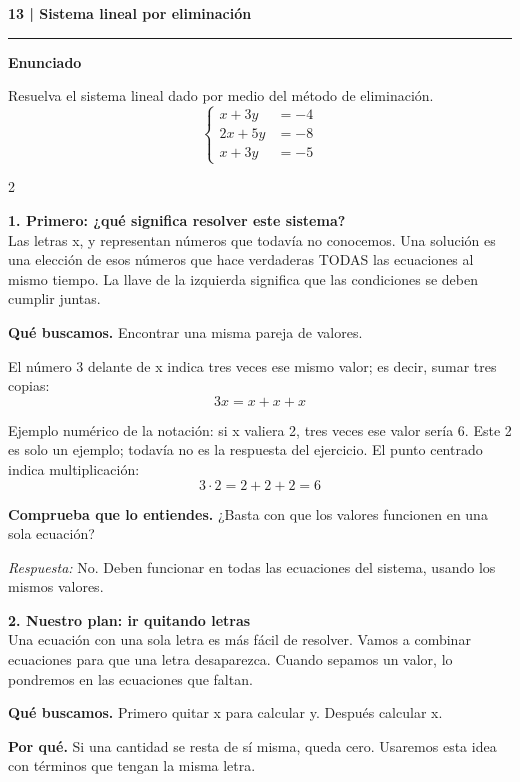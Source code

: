 \documentclass[11pt,a4paper,landscape]{article}
\newcommand{\titulo}[1]{{\LARGE\bfseries #1}\par\smallskip\hrule\medskip}
\begin{document}
\newpage{}\hypertarget{1.1-13}{}
\titulo{13 | Sistema lineal por eliminación}
\textbf{Enunciado}\par Resuelva el sistema lineal dado por medio del método de eliminación.
\[\left\{\begin{aligned}x + 3y &= -4\\2x + 5y &= -8\\x + 3y &= -5\end{aligned}\right.\]
\begin{multicols*}{2}
\noindent\begin{minipage}{\linewidth}\textbf{1. Primero: ¿qué significa resolver este sistema?}\\[2pt]Las letras x, y representan números que todavía no conocemos. Una solución es una elección de esos números que hace verdaderas TODAS las ecuaciones al mismo tiempo. La llave de la izquierda significa que las condiciones se deben cumplir juntas.
\par\smallskip\textbf{Qué buscamos.} Encontrar una misma pareja de valores.
\par\smallskip El número 3 delante de x indica tres veces ese mismo valor; es decir, sumar tres copias:
\[3x=x+x+x\]
\par\smallskip Ejemplo numérico de la notación: si x valiera 2, tres veces ese valor sería 6. Este 2 es solo un ejemplo; todavía no es la respuesta del ejercicio. El punto centrado indica multiplicación:
\[3\cdot 2=2+2+2=6\]
\par\smallskip\textbf{Comprueba que lo entiendes.} ¿Basta con que los valores funcionen en una sola ecuación?\par\textit{Respuesta:} No. Deben funcionar en todas las ecuaciones del sistema, usando los mismos valores.
\end{minipage}\par\medskip
\noindent\begin{minipage}{\linewidth}\textbf{2. Nuestro plan: ir quitando letras}\\[2pt]Una ecuación con una sola letra es más fácil de resolver. Vamos a combinar ecuaciones para que una letra desaparezca. Cuando sepamos un valor, lo pondremos en las ecuaciones que faltan.
\par\smallskip\textbf{Qué buscamos.} Primero quitar x para calcular y. Después calcular x.
\par\smallskip\textbf{Por qué.} Si una cantidad se resta de sí misma, queda cero. Usaremos esta idea con términos que tengan la misma letra.

\end{minipage}
\end{multicols*}
\end{document}
